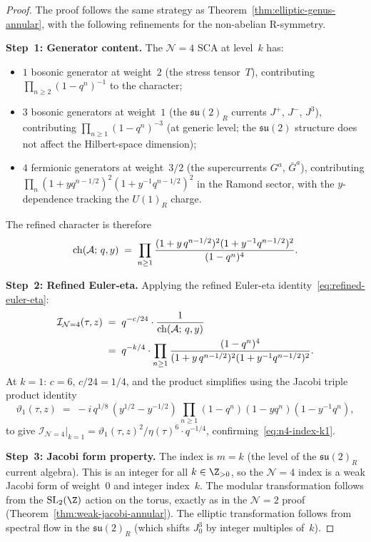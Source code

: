 \begin{proof}
The proof follows the same strategy as
Theorem~\ref{thm:elliptic-genus-annular}, with the
following refinements for the non-abelian R-symmetry.

\medskip\noindent
\textbf{Step~1: Generator content.}
The $\mathcal{N}=4$ SCA at level~$k$ has:
\begin{itemize}
\item $1$ bosonic generator at weight~$2$ (the stress
 tensor~$T$), contributing
 $\prod_{n\ge 2}(1-q^n)^{-1}$ to the character;
\item $3$ bosonic generators at weight~$1$ (the
 $\mathfrak{su}(2)_R$ currents $J^+$, $J^-$, $J^3$),
 contributing $\prod_{n\ge 1}(1-q^n)^{-3}$ (at generic
 level; the $\mathfrak{su}(2)$ structure does not affect
 the Hilbert-space dimension);
\item $4$ fermionic generators at weight~$3/2$ (the
 supercurrents $G^a$, $\bar G^a$), contributing
 $\prod_{n}(1+yq^{n-1/2})^2(1+y^{-1}q^{n-1/2})^2$
 in the Ramond sector, with the $y$-dependence tracking
 the $U(1)_R$ charge.
\end{itemize}

The refined character is therefore
\begin{equation}\label{eq:n4-character}
\operatorname{ch}(\mathcal{A};\,q,y)
\;=\;
\prod_{n\ge 1}
\frac{(1+y\,q^{n-1/2})^2(1+y^{-1}q^{n-1/2})^2}
{(1-q^n)^4}.
\end{equation}

\medskip\noindent
\textbf{Step~2: Refined Euler-eta.}
Applying the refined Euler-eta
identity~\eqref{eq:refined-euler-eta}:
\begin{align}
\mathcal{I}_{\mathcal{N}=4}(\tau,z)
&\;=\;
q^{-c/24}\cdot
\frac{1}{\operatorname{ch}(\mathcal{A};\,q,y)}
\notag\\
&\;=\;
q^{-k/4}\cdot
\prod_{n\ge 1}
\frac{(1-q^n)^4}
{(1+y\,q^{n-1/2})^2(1+y^{-1}q^{n-1/2})^2}.
\label{eq:n4-index-product}
\end{align}
At $k=1$: $c=6$, $c/24=1/4$, and the product
simplifies using the Jacobi triple product identity
\[
\vartheta_1(\tau,z)
\;=\;
-i\,q^{1/8}\,(y^{1/2}-y^{-1/2})\,
\prod_{n\ge 1}(1-q^n)(1-yq^n)(1-y^{-1}q^n),
\]
to give
$\mathcal{I}_{\mathcal{N}=4}|_{k=1}
= \vartheta_1(\tau,z)^2/\eta(\tau)^6
\cdot q^{-1/4}$,
confirming~\eqref{eq:n4-index-k1}.

\medskip\noindent
\textbf{Step~3: Jacobi form property.}
The index is $m = k$ (the level of the
$\mathfrak{su}(2)_R$ current algebra). This is an
integer for all $k\in\Z_{>0}$, so the
$\mathcal{N}=4$ index is a weak Jacobi form of
weight~$0$ and integer index~$k$.
The modular transformation follows from the
$\mathrm{SL}_2(\Z)$ action on the torus, exactly as
in the $\mathcal N=2$ proof
(Theorem~\ref{thm:weak-jacobi-annular}). The
elliptic transformation follows from spectral flow in the
$\mathfrak{su}(2)_R$ (which shifts $J^3_0$ by integer
multiples of~$k$).
\end{proof}

